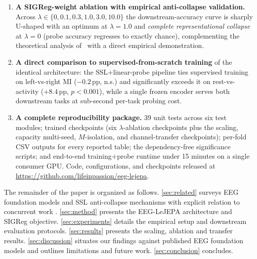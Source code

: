 \begin{enumerate}
\item \textbf{A SIGReg-weight ablation with empirical anti-collapse
validation.} Across $\lambda \in \{0, 0.1, 0.3, 1.0, 3.0, 10.0\}$ the
downstream-accuracy curve is sharply U-shaped with an optimum at
$\lambda{=}1.0$ and \emph{complete representational collapse} at
$\lambda{=}0$ (probe accuracy regresses to exactly chance), complementing
the theoretical analysis of~\cite{lejepa2025} with a direct empirical
demonstration.

\item \textbf{A direct comparison to supervised-from-scratch training}
of the identical architecture: the SSL$+$linear-probe pipeline ties
supervised training on left-vs-right MI ($-0.2$\,pp, n.s.) and
significantly exceeds it on rest-vs-activity ($+8.4$\,pp, $p<0.001$),
while a single frozen encoder serves both downstream tasks at sub-second
per-task probing cost.

\item \textbf{A complete reproducibility package.} 39 unit tests across
six test modules; trained checkpoints (six $\lambda$-ablation checkpoints
plus the scaling, capacity multi-seed, $M$-isolation, and channel-transfer
checkpoints); per-fold CSV outputs for every reported table; the
dependency-free significance scripts; and end-to-end training$+$probe
runtime under 15 minutes on a single consumer GPU. Code, configurations,
and checkpoints released at \url{https://github.com/lifeinpassion/eeg-lejepa}.
\end{enumerate}

The remainder of the paper is organized as follows.
\cref{sec:related} surveys EEG foundation models and SSL anti-collapse
mechanisms with explicit relation to concurrent work
\cite{laya2026}. \cref{sec:method} presents the EEG-LeJEPA architecture
and SIGReg objective. \cref{sec:experiments} details the empirical setup
and downstream evaluation protocols. \cref{sec:results} presents the
scaling, ablation and transfer results. \cref{sec:discussion} situates
our findings against published EEG foundation models and outlines
limitations and future work. \cref{sec:conclusion} concludes.

